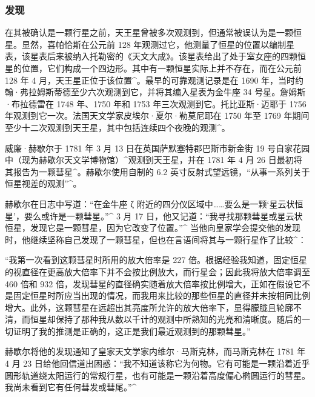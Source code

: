 \subsubsection{发现}
在其被确认是一颗行星之前，天王星曾被多次观测到，但通常被误认为是一颗恒星。显然，喜帕恰斯在公元前 128 年观测过它，他测量了恒星的位置以编制星表，该星表后来被纳入托勒密的《天文大成》。该星表给出了处于室女座的四颗恒星的位置，它们构成一个四边形。其中有一颗恒星实际上并不存在，而在公元前 128 年 4 月，天王星正位于该位置^{\text{[28]}}。最早的可靠观测记录是在 1690 年，当时约翰·弗拉姆斯蒂德至少六次观测到它，并将其编入星表为金牛座 34 号星。詹姆斯·布拉德雷在 1748 年、1750 年和 1753 年三次观测到它。托比亚斯·迈耶于 1756 年观测到它一次。法国天文学家皮埃尔·夏尔·勒莫尼耶在 1750 年至 1769 年期间至少十二次观测到天王星，其中包括连续四个夜晚的观测^{\text{[29]}}。

威廉·赫歇尔于 1781 年 3 月 13 日在英国萨默塞特郡巴斯市新金街 19 号自家花园中（现为赫歇尔天文学博物馆）^{\text{[30]}}观测到天王星，并在 1781 年 4 月 26 日最初将其报告为一颗彗星^{\text{[31]}}。赫歇尔使用自制的 6.2 英寸反射式望远镜，“从事一系列关于恒星视差的观测”^{\text{[32][33]}}。

赫歇尔在日志中写道：“在金牛座 ζ 附近的四分仪区域中……要么是一颗‘星云状恒星’，要么或许是一颗彗星。”^{\text{[34]}} 3 月 17 日，他又记道：“我寻找那颗彗星或星云状恒星，发现它是一颗彗星，因为它改变了位置。”^{\text{[35]}} 当他向皇家学会提交他的发现时，他继续坚称自己发现了一颗彗星，但也在言语间将其与一颗行星作了比较^{\text{[32]}}：

“我第一次看到这颗彗星时所用的放大倍率是 227 倍。根据经验我知道，固定恒星的视直径在更高放大倍率下并不会按比例放大，而行星会；因此我将放大倍率调至 460 倍和 932 倍，发现彗星的直径确实随着放大倍率按比例增大，正如在假设它不是固定恒星时所应当出现的情况，而我用来比较的那些恒星的直径并未按相同比例增大。此外，这颗彗星在远超出其亮度所允许的放大倍率下，显得朦胧且轮廓不清，而恒星却保持了那种我从数以千计的观测中所熟知的光亮和清晰度。随后的一切证明了我的推测是正确的，这正是我们最近观测到的那颗彗星。”

赫歇尔将他的发现通知了皇家天文学家内维尔·马斯克林，而马斯克林在 1781 年 4 月 23 日给他回信道出困惑：“我不知道该称它为何物。它有可能是一颗沿着近乎圆形轨道绕太阳运行的常规行星，也有可能是一颗沿着高度偏心椭圆运行的彗星。我尚未看到它有任何彗发或彗尾。”^{\text{[36]}}
